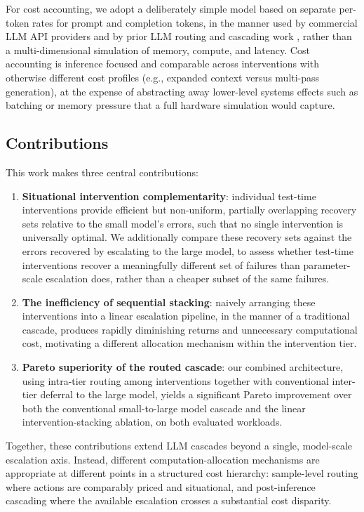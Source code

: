 \documentclass[sigconf]{acmart}
\begin{document}
For cost accounting, we adopt a deliberately simple model based on separate per-token rates for prompt and completion tokens, in the manner used by commercial LLM API providers and by prior LLM routing and cascading work \cite{chen2023frugalgptuselargelanguage, routerbench}, rather than a multi-dimensional simulation of memory, compute, and latency. Cost accounting is inference focused and comparable across interventions with otherwise different cost profiles (e.g., expanded context versus multi-pass generation), at the expense of abstracting away lower-level systems effects such as batching or memory pressure that a full hardware simulation would capture.
 
\subsection{Contributions}
 
This work makes three central contributions:
\begin{enumerate}
\item \textbf{Situational intervention complementarity}: individual test-time interventions provide efficient but non-uniform, partially overlapping recovery sets relative to the small model's errors, such that no single intervention is universally optimal. We additionally compare these recovery sets against the errors recovered by escalating to the large model, to assess whether test-time interventions recover a meaningfully different set of failures than parameter-scale escalation does, rather than a cheaper subset of the same failures.
\item \textbf{The inefficiency of sequential stacking}: naively arranging these interventions into a linear escalation pipeline, in the manner of a traditional cascade, produces rapidly diminishing returns and unnecessary computational cost, motivating a different allocation mechanism within the intervention tier.
\item \textbf{Pareto superiority of the routed cascade}: our combined architecture, using intra-tier routing among interventions together with conventional inter-tier deferral to the large model, yields a significant Pareto improvement over both the conventional small-to-large model cascade and the linear intervention-stacking ablation, on both evaluated workloads.
\end{enumerate}
 
Together, these contributions extend LLM cascades beyond a single, model-scale escalation axis. Instead, different computation-allocation mechanisms are appropriate at different points in a structured cost hierarchy: sample-level routing where actions are comparably priced and situational, and post-inference cascading where the available escalation crosses a substantial cost disparity.
\end{document}
